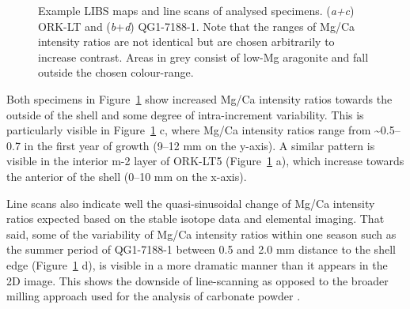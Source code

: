 \documentclass[
  authoryear,
  preprint,
  3p]{elsarticle}
\begin{document}
\begin{figure}[H]


\caption{\label{fig-Pat_LIBS}Example LIBS maps and line scans of
analysed specimens. (\emph{a+c}) ORK-LT and (\emph{b}+\emph{d})
QG1-7188-1. Note that the ranges of Mg/Ca intensity ratios are not
identical but are chosen arbitrarily to increase contrast. Areas in grey
consist of low-Mg aragonite and fall outside the chosen colour-range.}

\end{figure}%

Both specimens in Figure~\ref{fig-Pat_LIBS} show increased Mg/Ca
intensity ratios towards the outside of the shell and some degree of
intra-increment variability. This is particularly visible in
Figure~\ref{fig-Pat_LIBS} c, where Mg/Ca intensity ratios range from
\textasciitilde0.5--0.7 in the first year of growth (9--12 mm on the
y-axis). A similar pattern is visible in the interior m-2 layer of
ORK-LT5 (Figure~\ref{fig-Pat_LIBS} a), which increase towards the
anterior of the shell (0--10 mm on the x-axis).

Line scans also indicate well the quasi-sinusoidal change of Mg/Ca
intensity ratios expected based on the stable isotope data and elemental
imaging. That said, some of the variability of Mg/Ca intensity ratios
within one season such as the summer period of QG1-7188-1 between 0.5
and 2.0 mm distance to the shell edge (Figure~\ref{fig-Pat_LIBS} d), is
visible in a more dramatic manner than it appears in the 2D image. This
shows the downside of line-scanning as opposed to the broader milling
approach used for the analysis of carbonate powder
\citep{Ferguson2011-zl}.
\end{document}

